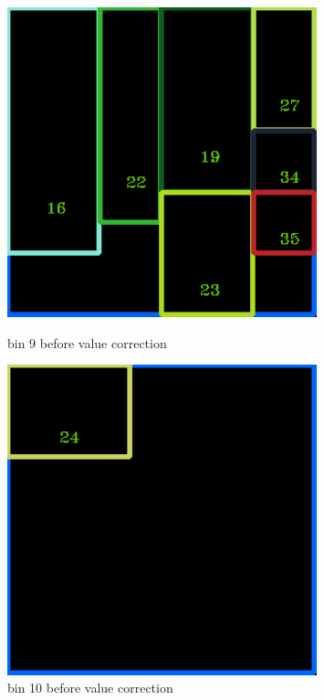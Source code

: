 \documentclass[11pt]{article}
\begin{document}
\begin{figure}
    \begin{minipage}[htb]{0.33\linewidth}
    \centering
    \includegraphics[width=0.8\textwidth]{FIGS/1/output9.png}
    \caption{bin 9 before value correction}
    \label{skyline}
    \end{minipage}
    \begin{minipage}[htb]{0.33\linewidth}
    \centering
    \includegraphics[width=0.8\textwidth]{FIGS/1/output10.png}
    \caption{bin 10 before value correction}
    \label{skyline}
    \end{minipage}
    \end{figure}
\end{document}

